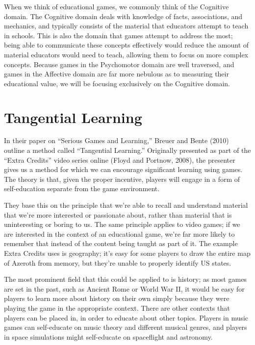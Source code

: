 \documentclass[12pt]{report}
\begin{document}
		When we think of educational games, we commonly think of the Cognitive domain. The Cognitive domain deals with knowledge of facts, associations, and mechanics, and typically consists of the material that educators attempt to teach in schools. This is also the domain that games attempt to address the most; being able to communicate these concepts effectively would reduce the amount of material educators would need to teach, allowing them to focus on more complex concepts. Because games in the Psychomotor domain are well traversed, and games in the Affective domain are far more nebulous as to measuring their educational value, we will be focusing exclusively on the Cognitive domain.

			

	\section{Tangential Learning}

		In their paper on “Serious Games and Learning,” Breuer and Bente (2010) outline a method called “Tangential Learning.” Originally presented as part of the “Extra Credits” video series online (Floyd and Portnow, 2008), the presenter gives us a method for which we can encourage significant learning using games. The theory is that, given the proper incentive, players will engage in a form of self-education separate from the game environment.
		
		They base this on the principle that we're able to recall and understand material that we're more interested or passionate about, rather than material that is uninteresting or boring to us. The same principle applies to video games; if we are interested in the context of an educational game, we're far more likely to remember that instead of the content being taught as part of it. The example Extra Credits uses is geography; it's easy for some players to draw the entire map of Azeroth from memory, but they're unable to properly identify US states.
		
		The most prominent field that this could be applied to is history; as most games are set in the past, such as Ancient Rome or World War II, it would be easy for players to learn more about history on their own simply because they were playing the game in the appropriate context. There are other contexts that players can be placed in, in order to educate about other topics. Players in music games can self-educate on music theory and different musical genres, and players in space simulations might self-educate on spaceflight and astronomy. 
		
\end{document}
